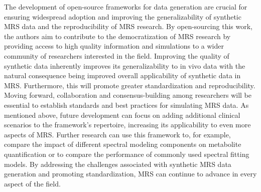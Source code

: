 The development of open-source frameworks for data generation are crucial for ensuring widespread adoption and improving the generalizability of synthetic MRS data and the reproducibility of MRS research. By open-sourcing this work, the authors aim to contribute to the democratization of MRS research by providing access to high quality information and simulations to a wider community of researchers interested in the field. Improving the quality of synthetic data inherently improves its generalizability to in vivo data with the natural consequence being improved overall applicability of synthetic data in MRS. Furthermore, this will promote greater standardization and reproducibility. Moving forward, collaboration and consensus-building among researchers will be essential to establish standards and best practices for simulating MRS data. As mentioned above, future development can focus on adding additional clinical scenarios to the framework's repertoire, increasing its applicability to even more aspects of MRS. Further research can use this framework to, for example, compare the impact of different spectral modeling components on metabolite quantification or to compare the performance of commonly used spectral fitting models. By addressing the challenges associated with synthetic MRS data generation and promoting standardization, MRS can continue to advance in every aspect of the field. 